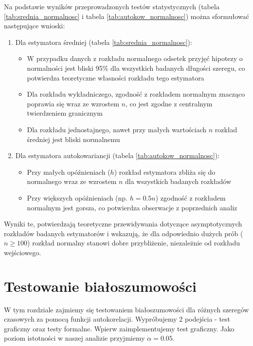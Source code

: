 \documentclass[10pt, a4paper]{article}\usepackage[]{graphicx}\usepackage[]{xcolor}
\begin{document}
\newpage
Na podstawie wyników przeprowadzonych testów statystycznych (tabela \ref{tab:srednia_normalnosc} i tabela \ref{tab:autokow_normalnosc}) można sformułować następujące wnioski:

\begin{enumerate}
  \item Dla estymatora średniej (tabela \ref{tab:srednia_normalnosc}):
  \begin{itemize}
    \item W przypadku danych z rozkładu normalnego odsetek przyjęć hipotezy o normalności jest bliski 95\% dla wszystkich badanych długości szeregu, co potwierdza teoretyczne własności rozkładu tego estymatora
    \item Dla rozkładu wykładniczego, zgodność z rozkładem normalnym znacząco poprawia się wraz ze wzrostem $n$, co jest zgodne z centralnym twierdzeniem granicznym
    \item Dla rozkładu jednostajnego, nawet przy małych wartościach $n$ rozkład średniej jest bliski normalnemu
  \end{itemize}
  
  \item Dla estymatora autokowariancji (tabela \ref{tab:autokow_normalnosc}):
  \begin{itemize}
    \item Przy małych opóźnieniach ($h$) rozkład estymatora zbliża się do normalnego wraz ze wzrostem $n$ dla wszystkich badanych rozkładów
    \item Przy większych opóźnieniach (np. $h = 0.5n$) zgodność z rozkładem normalnym jest gorsza, co potwierdza obserwacje z poprzednich analiz
  \end{itemize}
  
\end{enumerate}

Wyniki te, potwierdzają teoretyczne przewidywania dotyczące asymptotycznych rozkładów badanych estymatorów i wskazują, że dla odpowiednio dużych prób ($n \geq 100$) rozkład normalny stanowi dobre przybliżenie, niezależnie od rozkładu wejściowego.

\newpage
\section{Testowanie białoszumowości}
W tym rozdziale zajmiemy się testowaniem białoszumowości dla różnych szeregów czasowych za pomocą funkcji autokorelacji. Wypróbujemy 2 podejścia - test graficzny oraz testy formalne. Wpierw zaimplementujemy test graficzny. Jako poziom istotności w naszej analizie przyjmiemy $\alpha=0.05$.
\end{document}
